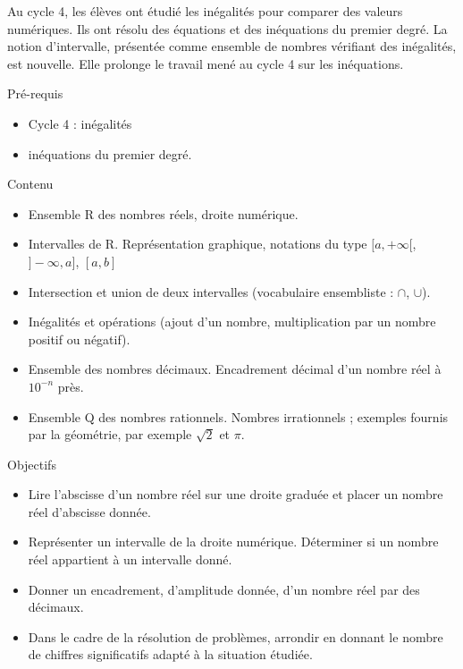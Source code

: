 \documentclass{article}
\theoremstyle{definition}
\begin{document}
\pagestyle{fancy}

\fancyhf{} %
\fancyhead[L]{\large \textbf{\Niveau}}
\fancyhead[C]{\large \textbf{\Chapitre}}

\large

Au cycle 4, les élèves ont étudié les inégalités pour comparer des valeurs numériques. Ils ont résolu des équations et des
inéquations du premier degré. La notion d'intervalle, présentée comme ensemble de nombres vérifiant des inégalités, est
nouvelle. Elle prolonge le travail mené au cycle 4 sur les inéquations.

\begin{paragraph}{Pré-requis}
  \begin{itemize}
    \item Cycle 4 : inégalités
    \item inéquations du premier degré.
  \end{itemize}
\end{paragraph}

\begin{paragraph}{Contenu}
    \begin{itemize}
        \item Ensemble R des nombres réels, droite numérique.
        \item Intervalles de R. Représentation graphique, notations du type $[a, +\infty[$, $]-\infty, a]$, $[a, b]$
        \item Intersection et union de deux intervalles (vocabulaire ensembliste : $\cap$, $\cup$).
        \item Inégalités et opérations (ajout d'un nombre, multiplication par un nombre positif ou négatif).
        \item Ensemble des nombres décimaux. Encadrement décimal d'un nombre réel à $10^{-n}$ près.
        \item Ensemble Q des nombres rationnels. Nombres irrationnels ; exemples fournis par la géométrie, par exemple $\sqrt{2}$ et $\pi$.
    \end{itemize}
\end{paragraph}

\begin{paragraph}{Objectifs}
  \begin{itemize}
    \item Lire l'abscisse d'un nombre réel sur une droite graduée et placer un nombre réel d'abscisse donnée.
    \item Représenter un intervalle de la droite numérique. Déterminer si un nombre réel appartient à un intervalle donné.
    \item Donner un encadrement, d'amplitude donnée, d'un nombre réel par des décimaux.
    \item Dans le cadre de la résolution de problèmes, arrondir en donnant le nombre de chiffres significatifs adapté à la situation
étudiée.
  \end{itemize} 
\end{paragraph}
\end{document}
